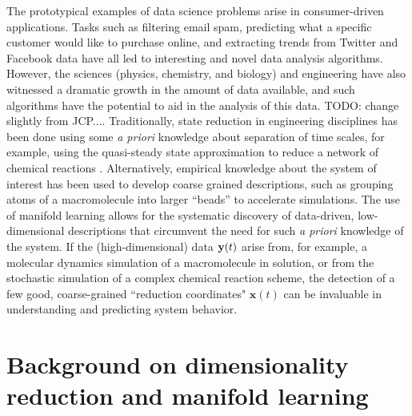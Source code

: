 The prototypical examples of data science problems arise in consumer-driven applications. %
Tasks such as filtering email spam, predicting what a specific customer would like to purchase online, and extracting trends from Twitter and Facebook data have all led to interesting and novel data analysis algorithms. 
%
However, the sciences (physics, chemistry, and biology) and engineering have also witnessed a dramatic growth in the amount of data available, and such algorithms have the potential to aid in the analysis of this data. 
%
%
%
%
%
%
%
TODO: change slightly from JCP....
Traditionally, state reduction in engineering disciplines has been done using some {\em a priori} knowledge about separation of time scales,
for example, using the quasi-steady state approximation to reduce a network of chemical reactions \cite{bowen1963singular}.
%
Alternatively, empirical knowledge about the system of interest has been used to develop coarse grained descriptions,
such as grouping atoms of a macromolecule into larger ``beads'' to accelerate simulations\cite{monticelli2008martini, spiga2013electrostatic,izvekov2005systematic, saunders2013coarse}.
%
The use of manifold learning allows for the systematic discovery of data-driven, low-dimensional descriptions that circumvent the need for such {\em a priori} knowledge of the system.
%
If the (high-dimensional) data $\mathbf{y}(t)$ arise from, for example, a
molecular dynamics simulation of a macromolecule in solution, or from the stochastic
simulation of a complex chemical reaction scheme, the detection of a few good, coarse-grained
``reduction coordinates" $\mathbf{x}(t)$ can be invaluable in understanding and predicting system behavior.
%


\section{Background on dimensionality reduction and manifold learning} \label{sec:background}

